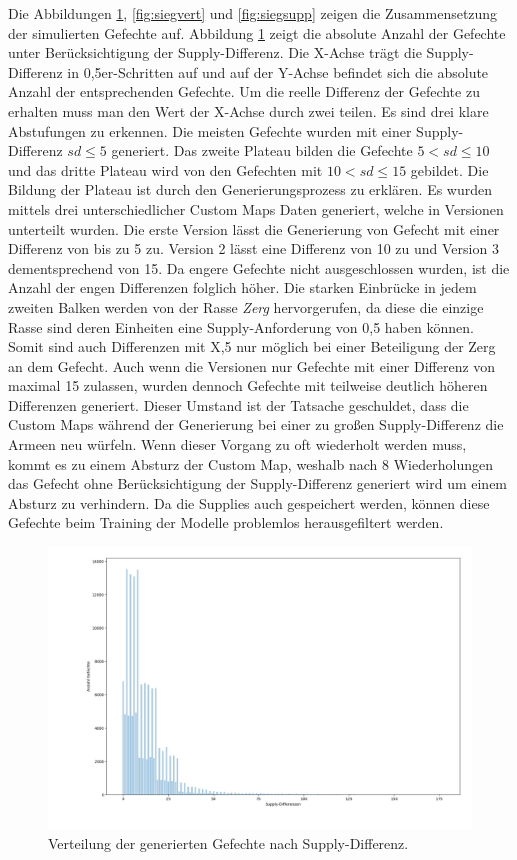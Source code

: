 Die Abbildungen \ref{fig:suppvert}, \ref{fig:siegvert} und \ref{fig:siegsupp} zeigen die Zusammensetzung der simulierten Gefechte auf. Abbildung \ref{fig:suppvert} zeigt die absolute Anzahl der Gefechte unter Berücksichtigung der Supply-Differenz. Die X-Achse trägt die Supply-Differenz in 0,5er-Schritten auf und auf der Y-Achse befindet sich die absolute Anzahl der entsprechenden Gefechte. Um die reelle Differenz der Gefechte zu erhalten muss man den Wert der X-Achse durch zwei teilen. Es sind drei klare Abstufungen zu erkennen. Die meisten Gefechte wurden mit einer Supply-Differenz $sd \leq 5$ generiert. Das zweite Plateau bilden die Gefechte $5 < sd \leq 10$ und das dritte Plateau wird von den Gefechten mit $10 < sd \leq 15$  gebildet. Die Bildung der Plateau ist durch den Generierungsprozess zu erklären. Es wurden mittels drei unterschiedlicher Custom Maps Daten generiert, welche in Versionen unterteilt wurden. Die erste Version lässt die Generierung von Gefecht mit einer Differenz von bis zu 5 zu. Version 2 lässt eine Differenz von 10 zu und Version 3 dementsprechend von 15. Da engere Gefechte nicht ausgeschlossen wurden, ist die Anzahl der engen Differenzen folglich höher. Die starken Einbrücke in jedem zweiten Balken werden von der Rasse \textit{Zerg} hervorgerufen, da diese die einzige Rasse sind deren Einheiten eine Supply-Anforderung von 0,5 haben können. Somit sind auch Differenzen mit X,5 nur möglich bei einer Beteiligung der Zerg an dem Gefecht. Auch wenn die Versionen nur Gefechte mit einer Differenz von maximal 15 zulassen, wurden dennoch Gefechte mit teilweise deutlich höheren Differenzen generiert. Dieser Umstand ist der Tatsache geschuldet, dass die Custom Maps während der Generierung bei einer zu großen Supply-Differenz die Armeen neu würfeln. Wenn dieser Vorgang zu oft wiederholt werden muss, kommt es zu einem Absturz der Custom Map, weshalb nach 8  Wiederholungen das Gefecht ohne Berücksichtigung der Supply-Differenz generiert wird um einem Absturz zu verhindern. Da die Supplies auch gespeichert werden, können diese Gefechte beim Training der Modelle problemlos herausgefiltert werden. 

\begin{figure}[H]
\centering
\includegraphics[scale=0.4]{pictures/Match_verteilung}
\caption{Verteilung der generierten Gefechte nach Supply-Differenz.}
\label{fig:suppvert}
\end{figure}

